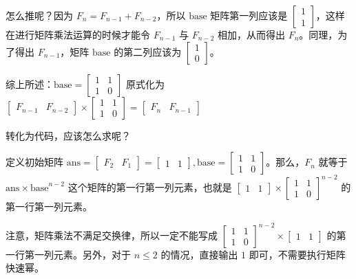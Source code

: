 怎么推呢？因为 $F_n=F_{n-1}+F_{n-2}$，所以 $\text{base}$ 矩阵第一列应该是 $\left[\begin{array}{ccc} 1 \\ 1 \end{array}\right]$，这样在进行矩阵乘法运算的时候才能令 $F_{n-1}$ 与 $F_{n-2}$ 相加，从而得出 $F_n$。同理，为了得出 $F_{n-1}$，矩阵 $\text{base}$ 的第二列应该为 $\left[\begin{array}{ccc} 1 \\ 0 \end{array}\right]$。

综上所述：$\text{base} = \left[\begin{array}{ccc} 1 & 1 \\ 1 & 0 \end{array}\right]$ 原式化为 $\left[\begin{array}{ccc}F_{n-1} & F_{n-2}\end{array}\right] \times \left[\begin{array}{ccc} 1 & 1 \\ 1 & 0 \end{array}\right] = \left[ \begin{array}{ccc}F_n & F_{n-1} \end{array}\right]$

转化为代码，应该怎么求呢？

定义初始矩阵 $\text{ans} = \left[\begin{array}{ccc}F_2 & F_1\end{array}\right] = \left[\begin{array}{ccc}1 & 1\end{array}\right], \text{base} = \left[\begin{array}{ccc} 1 & 1 \\ 1 & 0 \end{array}\right]$。那么，$F_n$ 就等于 $\text{ans} \times \text{base}^{n-2}$ 这个矩阵的第一行第一列元素，也就是 $\left[\begin{array}{ccc}1 & 1\end{array}\right] \times \left[\begin{array}{ccc} 1 & 1 \\ 1 & 0 \end{array}\right]^{n-2}$ 的第一行第一列元素。

注意，矩阵乘法不满足交换律，所以一定不能写成 $\left[\begin{array}{ccc} 1 & 1 \\ 1 & 0 \end{array}\right]^{n-2} \times \left[\begin{array}{ccc}1 & 1\end{array}\right]$ 的第一行第一列元素。另外，对于 $n \leq 2$ 的情况，直接输出 $1$ 即可，不需要执行矩阵快速幂。

